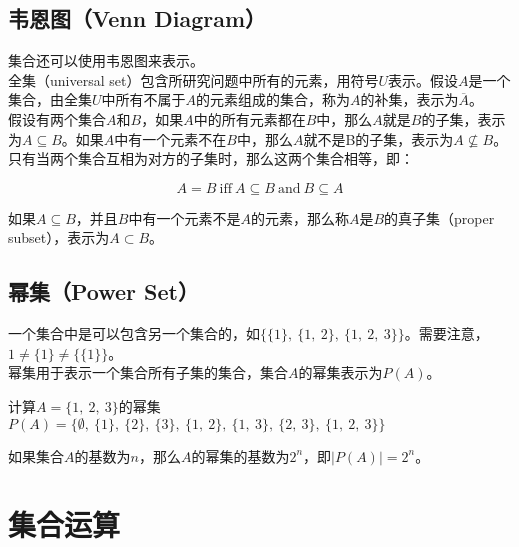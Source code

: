 \vspace{0.5cm}

\subsection{韦恩图（Venn Diagram）}

集合还可以使用韦恩图来表示。\\

全集（universal set）包含所研究问题中所有的元素，用符号$ U $表示。假设$ A $是一个集合，由全集$ U $中所有不属于$ A $的元素组成的集合，称为$ A $的补集，表示为$ \overline A $。\\

假设有两个集合$ A $和$ B $，如果$ A $中的所有元素都在$ B $中，那么$ A $就是$ B $的子集，表示为$ A \subseteq B $。如果$ A $中有一个元素不在$ B $中，那么$ A $就不是B的子集，表示为$ A \nsubseteq B $。只有当两个集合互相为对方的子集时，那么这两个集合相等，即：

\vspace{-0.5cm}

$$
	A = B\ \text{iff}\ A \subseteq B\ \text{and}\ B \subseteq A
$$

如果$ A \subseteq B $，并且$ B $中有一个元素不是$ A $的元素，那么称$ A $是$ B $的真子集（proper subset），表示为$ A \subset B $。\\

\subsection{幂集（Power Set）}

一个集合中是可以包含另一个集合的，如$ \{\{1\},\ \{1,\ 2\},\ \{1,\ 2,\ 3\}\} $。需要注意，$ 1 \neq \{1\} \neq \{\{1\}\} $。\\

幂集用于表示一个集合所有子集的集合，集合$ A $的幂集表示为$ P(A) $。

\begin{tcolorbox}
	计算$ A = \{1,\ 2,\ 3\} $的幂集\\
	$ P(A) = \{\emptyset,\ \{1\},\ \{2\},\ \{3\},\ \{1,\ 2\},\ \{1,\ 3\},\ \{2,\ 3\},\ \{1,\ 2,\ 3\}\} $
\end{tcolorbox}

如果集合$ A $的基数为$ n $，那么$ A $的幂集的基数为$ 2^n $，即$ |P(A)| = 2^n $。

\newpage

\section{集合运算}


